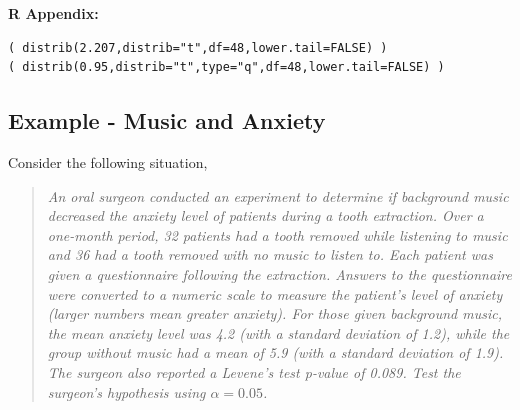 \documentclass[10pt,openany]{book}\usepackage[]{graphicx}\usepackage[]{color}
\makeatletter
\newenvironment{kframe}{%
 \def\at@end@of@kframe{}%
 \ifinner\ifhmode%
  \def\at@end@of@kframe{\end{minipage}}%
  \begin{minipage}{\columnwidth}%
 \fi\fi%
 \def\FrameCommand##1{\hskip\@totalleftmargin \hskip-\fboxsep
 \colorbox{shadecolor}{##1}\hskip-\fboxsep
     \hskip-\linewidth \hskip-\@totalleftmargin \hskip\columnwidth}%
 \MakeFramed {\advance\hsize-\width
   \@totalleftmargin\z@ \linewidth\hsize
   \@setminipage}}%
 {\par\unskip\endMakeFramed%
 \at@end@of@kframe}
\newenvironment{knitrout}{}{} %
\makeatother
\begin{document}
\vspace{-6pt}
\begin{minipage}{\textwidth}
\textbf{R Appendix:}
\vspace{-6pt}
\begin{knitrout}
\color{fgcolor}\begin{kframe}
\begin{verbatim}
( distrib(2.207,distrib="t",df=48,lower.tail=FALSE) )
( distrib(0.95,distrib="t",type="q",df=48,lower.tail=FALSE) )
\end{verbatim}
\end{kframe}
\end{knitrout}
\end{minipage}

\newpage
\subsection{Example - Music and Anxiety}
\vspace{-12pt}
Consider the following situation,
\vspace{-12pt}
\begin{quote}
\textsl{An oral surgeon conducted an experiment to determine if background music decreased the anxiety level of patients during a tooth extraction.  Over a one-month period, 32 patients had a tooth removed while listening to music and 36 had a tooth removed with no music to listen to.  Each patient was given a questionnaire following the extraction.  Answers to the questionnaire were converted to a numeric scale to measure the patient's level of anxiety (larger numbers mean greater anxiety).  For those given background music, the mean anxiety level was 4.2 (with a standard deviation of 1.2), while the group without music had a mean of 5.9 (with a standard deviation of 1.9).  The surgeon also reported a Levene's test p-value of 0.089.  Test the surgeon's hypothesis using $\alpha=0.05$.}
\end{quote}
\end{document}

